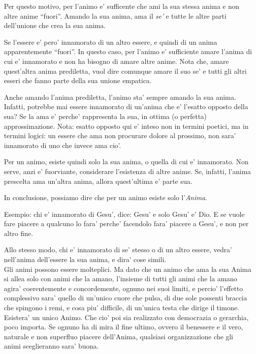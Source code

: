 Per questo motivo, per l'animo e' sufficente che ami la sua stessa anima e non altre anime ``fuori''. Amando la sua anima, ama il \emph{se'} e tutte le altre parti dell'unione che crea la sua anima.

Se l'essere e' pero' innamorato di un altro essere, e quindi di un anima apparentemente ``fuori''. In questo caso, per l'animo e' sufficiente amare l'anima di cui e' innamorato e non ha bisogno di amare altre anime. Nota che, amare quest'altra anima prediletta, vuol dire comunque amare il suo se' e tutti gli altri esseri che fanno parte della sua unione empatica.

Anche amando l'anima prediletta, l'animo sta' sempre amando la sua anima. Infatti, potrebbe mai essere innamorato di un'anima che e' l'esatto opposto della sua? Se la ama e' perche' rappresenta la sua, in ottima (o perfetta) approssimazione. Nota: esatto opposto qui e' inteso non in termini poetici, ma in termini logici: un essere che ama non procurare dolore al prossimo, non sara' innamorato di uno che invece ama cio'.

Per un animo, esiste quindi solo la sua anima, o quella di cui e' innamorato. Non serve, anzi e' fuorviante, considerare l'esistenza di altre anime. Se, infatti, l'anima prescelta ama un'altra anima, allora quest'ultima e' parte sua. 

In conclusione, possiamo dire che per un animo esiste solo l'\emph{Anima}.

Esempio: chi e' innamorato di Gesu', dice: Gesu' e solo Gesu' e' Dio. E se vuole fare piacere a qualcuno lo fara' perche' facendolo fara' piacere a Gesu', e non per altro fine. 

Allo stesso modo, chi e' innamorato di se' stesso o di un altro essere, vedra' nell'anima dell'essere la sua anima, e dira' cose simili. \\

Gli animi possono essere molteplici. Ma dato che un animo che ama la sua Anima si allea solo con animi che la amano, l'insieme di tutti gli animi che la amano agira' coerentemente e concordemente, ognuno nei suoi limiti, e percio' l'effetto complessivo sara' quello di un'unico cuore che pulsa, di due sole possenti braccia che spingono i remi, e cosa piu' difficile, di un'unica testa che dirige il timone. Esistera' un unico Animo. Che cio' poi sia realizzato con democrazia o gerarchia, poco importa. Se ognuno ha di mira il fine ultimo, ovvero il benessere e il vero, naturale e non superfluo piacere dell'Anima, qualsiasi organizzazione che gli animi sceglieranno sara' buona.

